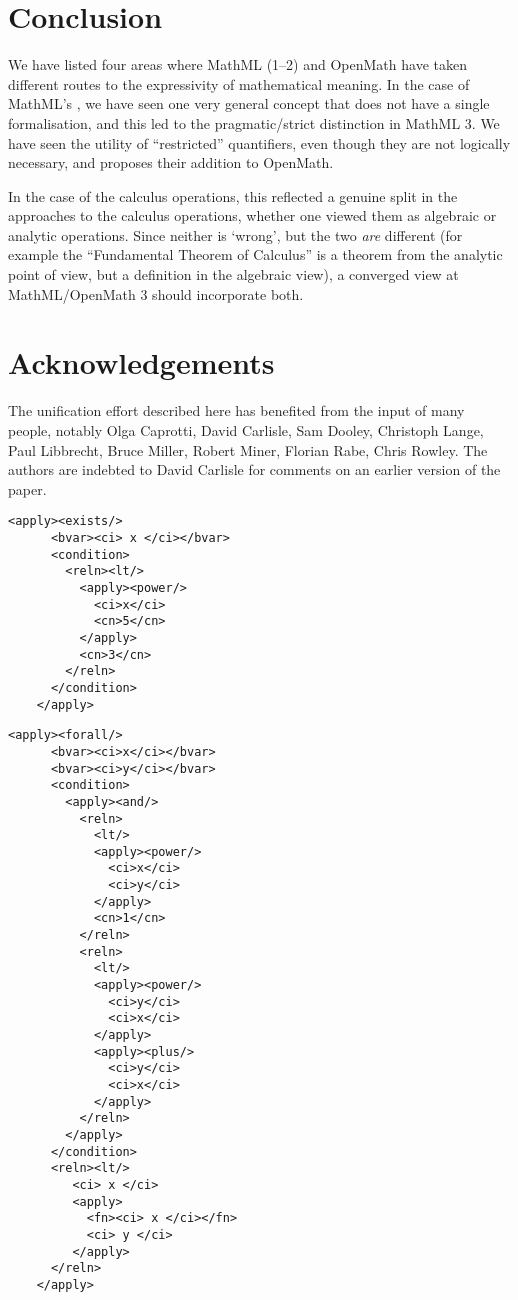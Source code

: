 \documentclass{llncs}
\begin{document}
{\section{Conclusion}
We have listed four areas where MathML (1--2) and OpenMath have taken different routes to
the expressivity of mathematical meaning.  
In the case of MathML's {}, we have seen one very general concept that
does not have a single formalisation, and this led to the pragmatic/strict distinction in
MathML 3. We have seen the utility of ``restricted'' quantifiers, even though they are not
logically necessary, and \cite{DavenportKohlhase2009c} proposes their addition to
OpenMath.

In the case of the calculus operations, this reflected a genuine split in the approaches
to the calculus operations, whether one viewed them as algebraic or analytic
operations. Since neither is `wrong', but the two {\it are\/} different (for example the
``Fundamental Theorem of Calculus'' is a theorem from the analytic point of view, but a
definition in the algebraic view), a converged view at MathML/OpenMath 3 should
incorporate both.

\section*{Acknowledgements}
The unification effort described here has benefited from the input of many people, notably
Olga Caprotti, David Carlisle, Sam Dooley, Christoph Lange, Paul Libbrecht, Bruce Miller,
Robert Miner, Florian Rabe, Chris Rowley. The authors are indebted to David Carlisle for
comments on an earlier version of the paper.

\iffull
\begin{lstlisting}[label=ex:exists,language=MathML2,
  caption={MathML 1 for ``there exists $x$ such that $x^5 < 3$''}]
    <apply><exists/>
      <bvar><ci> x </ci></bvar>
      <condition>
        <reln><lt/>
          <apply><power/>
            <ci>x</ci>
            <cn>5</cn>
          </apply>
          <cn>3</cn>
        </reln>
      </condition>
    </apply>
\end{lstlisting}

\begin{lstlisting}[label=ex:forall,language=MathML2, 
  caption={MathML-1 for ``for all $x$,$y$ such that $x^y < 1$ and $y^x < x + y$,$x < Q(y)$''}]
    <apply><forall/>
      <bvar><ci>x</ci></bvar>
      <bvar><ci>y</ci></bvar>
      <condition>
        <apply><and/>
          <reln>
            <lt/>
            <apply><power/>
              <ci>x</ci>
              <ci>y</ci>
            </apply>
            <cn>1</cn>
          </reln>
          <reln>
            <lt/>
            <apply><power/>
              <ci>y</ci>
              <ci>x</ci>
            </apply>
            <apply><plus/>
              <ci>y</ci>
              <ci>x</ci>
            </apply>
          </reln>
        </apply>
      </condition>
      <reln><lt/>
         <ci> x </ci>
         <apply>
           <fn><ci> x </ci></fn>
           <ci> y </ci>
         </apply>
      </reln>
    </apply>
\end{lstlisting}

}
\end{document}
